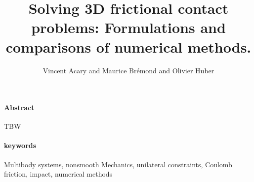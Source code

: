 \documentclass[10pt]{article}
\title{Solving 3D frictional contact problems: Formulations and comparisons of numerical methods.}
\author{Vincent Acary and Maurice Br\'emond and Olivier Huber}
\begin{document}
\pagestyle{fancy}
\thispagestyle{fancy}
\maketitle
\tableofcontents
\clearpage
{\paragraph{Abstract} TBW}

{\paragraph{keywords} Multibody systems, nonsmooth Mechanics,  unilateral constraints, Coulomb friction, impact, numerical methods}




\end{document}
